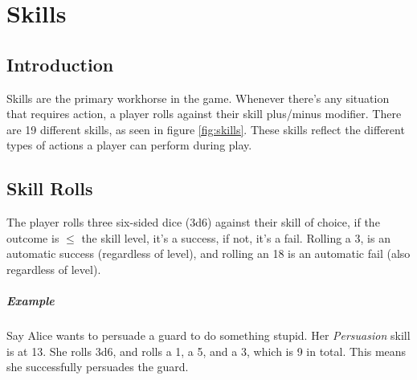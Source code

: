 \chapter{Skills} \label{chap:skills}
\section{Introduction}
Skills are the primary workhorse in the game. 
Whenever there's any situation that requires action, a player rolls against their skill plus/minus modifier. 
There are 19 different skills, as seen in figure \ref{fig:skills}. 
These skills reflect the different types of actions a player can perform during play.

\section{Skill Rolls}
The player rolls three six-sided dice (3d6) against their skill of choice, if the outcome is $\leq$ the skill level, it's a success, if not, it's a fail.
Rolling a 3, is an automatic success (regardless of level), and rolling an 18 is an automatic fail (also regardless of level).

\paragraph{Example} Say Alice wants to persuade a guard to do something stupid. Her \textit{Persuasion} skill is at 13. 
She rolls 3d6, and rolls a 1, a 5, and a 3, which is 9 in total. This means she successfully persuades the guard.

